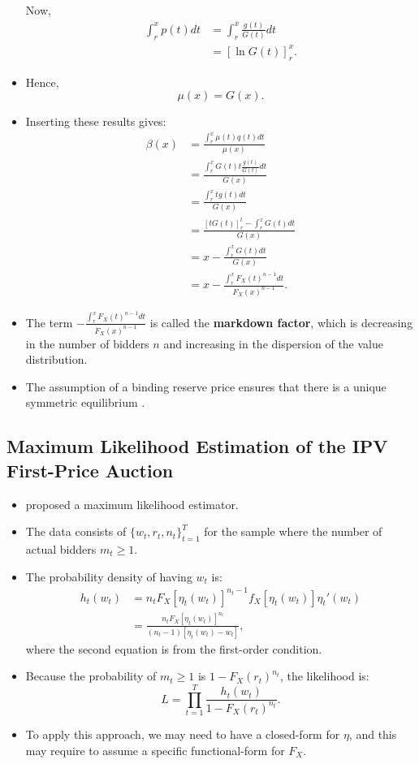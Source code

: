 \documentclass[
]{book}
\begin{document}
\begin{itemize}
  Now,
  \[
  \begin{split}
  \int_{r}^x p(t) dt &= \int_{r}^x \frac{g(t)}{G(t)} dt\\
  &= [\ln G(t)]_r^x.
  \end{split}
  \]
\item
  Hence,
  \[
  \mu(x) = G(x).
  \]
\item
  Inserting these results gives:
  \[
  \begin{split}
  \beta(x) &= \frac{\int_r^x \mu(t) q(t) dt}{\mu(x)}\\
  &= \frac{\int_r^x G(t) t \frac{g(t)}{G(t)} dt}{G(x)}\\
  &= \frac{\int_r^x t g(t) dt}{G(x)}\\
  &= \frac{[t G(t)]_r^t - \int_{r}^x G(t) dt }{G(x)}\\
  &= x - \frac{\int_r^x G(t) dt}{G(x)}\\
  &= x - \frac{\int_r^x F_X(t)^{n - 1} dt}{F_X(x)^{n - 1}}.
  \end{split}
  \]
\item
  The term \(- \frac{\int_r^x F_X(t)^{n - 1} dt}{F_X(x)^{n - 1}}\) is called the \textbf{markdown factor}, which is decreasing in the number of bidders \(n\) and increasing in the dispersion of the value distribution.
\item
  The assumption of a binding reserve price ensures that there is a unique symmetric equilibrium \citep{atheyChapter60Nonparametric2007}.
\end{itemize}

\hypertarget{maximum-likelihood-estimation-of-the-ipv-first-price-auction}{%
\subsection{Maximum Likelihood Estimation of the IPV First-Price Auction}\label{maximum-likelihood-estimation-of-the-ipv-first-price-auction}}

\begin{itemize}
\item
  \citet{donaldPiecewisePseudoMaximumLikelihood1993} proposed a maximum likelihood estimator.
\item
  The data consists of \(\{w_t, r_t, n_t\}_{t = 1}^T\) for the sample where the number of actual bidders \(m_t \ge 1\).
\item
  The probability density of having \(w_t\) is:
  \[
  \begin{split}
  h_t(w_t) &= n_t F_X[\eta_t(w_t)]^{n_t - 1} f_X[\eta_t(w_t)] \eta_t'(w_t)\\
  &= \frac{n_t F_X[\eta_t(w_t)]^{n_t}}{(n_t - 1)[\eta_t(w_t) - w_t]},
  \end{split}
  \]
  where the second equation is from the first-order condition.
\item
  Because the probability of \(m_t \ge 1\) is \(1 - F_X(r_t)^{n_t}\), the likelihood is:
  \[
  L = \prod_{t = 1}^T \frac{h_t(w_t)}{1 - F_X(r_t)^{n_t}}.
  \]
\item
  To apply this approach, we may need to have a closed-form for \(\eta\), and this may require to assume a specific functional-form for \(F_X\).
\end{itemize}
\end{document}
